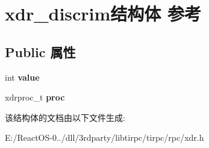 \hypertarget{structxdr__discrim}{}\section{xdr\+\_\+discrim结构体 参考}
\label{structxdr__discrim}
\subsection*{Public 属性}
\begin{DoxyCompactItemize}
\item 
\mbox{\label{structxdr__discrim_a57526f1125df7af463b2556af10916cb}} 
int {\bfseries value}
\item 
\mbox{\label{structxdr__discrim_ab83aaddb7d00ff4a66497c3024e9d8c9}} 
xdrproc\+\_\+t {\bfseries proc}
\end{DoxyCompactItemize}


该结构体的文档由以下文件生成\+:\begin{DoxyCompactItemize}
\item 
E\+:/\+React\+O\+S-\/0../dll/3rdparty/libtirpc/tirpc/rpc/xdr.\+h\end{DoxyCompactItemize}

